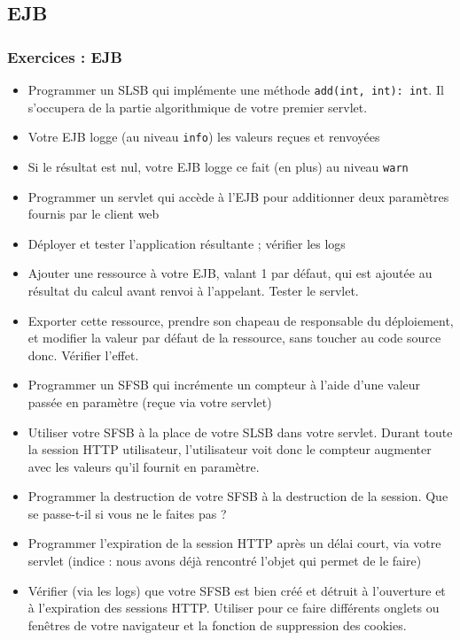 \documentclass[english, french]{beamer}
\begin{document}
\subsection{EJB}
\begin{frame}[allowframebreaks]
	\frametitle{Exercices : EJB}
	\begin{itemize}
		\item Programmer un SLSB qui implémente une méthode \texttt{add(int, int): int}. Il s’occupera de la partie algorithmique de votre premier servlet.
		\item Votre EJB logge (au niveau \texttt{info}) les valeurs reçues et renvoyées
		\item Si le résultat est nul, votre EJB logge ce fait (en plus) au niveau \texttt{warn}
		\item Programmer un servlet qui accède à l’EJB pour additionner deux paramètres fournis par le client web
		\item Déployer et tester l’application résultante ; vérifier les logs
		\item Ajouter une ressource à votre EJB, valant 1 par défaut, qui est ajoutée au résultat du calcul avant renvoi à l’appelant. Tester le servlet.
		\item Exporter cette ressource, prendre son chapeau de responsable du déploiement, et modifier la valeur par défaut de la ressource, sans toucher au code source donc. Vérifier l’effet.
		\item Programmer un SFSB qui incrémente un compteur à l’aide d’une valeur passée en paramètre (reçue via votre servlet)
		\item Utiliser votre SFSB à la place de votre SLSB dans votre servlet. Durant toute la session HTTP utilisateur, l’utilisateur voit donc le compteur augmenter avec les valeurs qu’il fournit en paramètre.
		\item Programmer la destruction de votre SFSB à la destruction de la session. Que se passe-t-il si vous ne le faites pas ?
		\item Programmer l’expiration de la session HTTP après un délai court, via votre servlet (indice : nous avons déjà rencontré l’objet qui permet de le faire)
		\item Vérifier (via les logs) que votre SFSB est bien créé et détruit à l’ouverture et à l’expiration des sessions HTTP. Utiliser pour ce faire différents onglets ou fenêtres de votre navigateur et la fonction de suppression des cookies.
	\end{itemize}
\end{frame}
\end{document}

